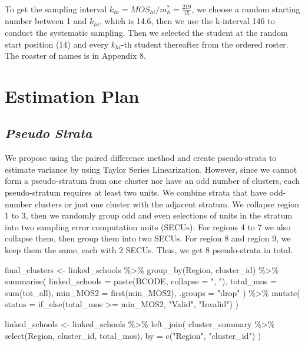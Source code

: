 \documentclass[
  12pt]{article}
\newenvironment{Shaded}{\begin{snugshade}}{\end{snugshade}}
\newcommand{\AttributeTok}[1]{\textcolor[rgb]{0.40,0.45,0.13}{#1}}
\newcommand{\FunctionTok}[1]{\textcolor[rgb]{0.28,0.35,0.67}{#1}}
\newcommand{\NormalTok}[1]{\textcolor[rgb]{0.00,0.23,0.31}{#1}}
\newcommand{\OtherTok}[1]{\textcolor[rgb]{0.00,0.23,0.31}{#1}}
\newcommand{\SpecialCharTok}[1]{\textcolor[rgb]{0.37,0.37,0.37}{#1}}
\newcommand{\StringTok}[1]{\textcolor[rgb]{0.13,0.47,0.30}{#1}}
\begin{document}
To get the sampling interval
\(k_{hi} = MOS_{hi} / m^*_{h} = \frac{219}{15}\), we choose a random
starting number between 1 and \(k_{hi}\), which is 14.6, then we use the
k-interval 146 to conduct the systematic sampling. Then we selected the
student at the random start position (14) and every \(k_{hi}\)-th
student thereafter from the ordered roster. The roaster of names is in
Appendix 8.

\section{Estimation Plan}\label{estimation-plan}

\subsection{\texorpdfstring{\emph{Pseudo
Strata}}{Pseudo Strata}}\label{pseudo-strata}

We propose using the paired difference method and create pseudo-strata
to estimate variance by using Taylor Series Linearization. However,
since we cannot form a pseudo-stratum from one cluster nor have an odd
number of clusters, each pseudo-stratum requires at least two units. We
combine strata that have odd-number clusters or just one cluster with
the adjacent stratum. We collapse region 1 to 3, then we randomly group
odd and even selections of units in the stratum into two sampling error
computation units (SECUs). For regions 4 to 7 we also collapse them,
then group them into two SECUs. For region 8 and region 9, we keep them
the same, each with 2 SECUs. Thus, we get 8 pseudo-strata in total.

\begin{Shaded}
\begin{Highlighting}[]
\NormalTok{final\_clusters }\OtherTok{\textless{}{-}}\NormalTok{ linked\_schools }\SpecialCharTok{\%\textgreater{}\%}
  \FunctionTok{group\_by}\NormalTok{(Region, cluster\_id) }\SpecialCharTok{\%\textgreater{}\%}
  \FunctionTok{summarise}\NormalTok{(}
    \AttributeTok{linked\_schools =} \FunctionTok{paste}\NormalTok{(BCODE, }\AttributeTok{collapse =} \StringTok{", "}\NormalTok{),}
    \AttributeTok{total\_mos =} \FunctionTok{sum}\NormalTok{(tot\_all),}
    \AttributeTok{min\_MOS2 =} \FunctionTok{first}\NormalTok{(min\_MOS2),}
    \AttributeTok{.groups =} \StringTok{"drop"}
\NormalTok{  ) }\SpecialCharTok{\%\textgreater{}\%}
  \FunctionTok{mutate}\NormalTok{(}
    \AttributeTok{status =} \FunctionTok{if\_else}\NormalTok{(total\_mos }\SpecialCharTok{\textgreater{}=}\NormalTok{ min\_MOS2, }\StringTok{"Valid"}\NormalTok{, }\StringTok{"Invalid"}\NormalTok{)}
\NormalTok{  )}


\NormalTok{linked\_schools }\OtherTok{\textless{}{-}}\NormalTok{ linked\_schools }\SpecialCharTok{\%\textgreater{}\%}
  \FunctionTok{left\_join}\NormalTok{(}
\NormalTok{    cluster\_summary }\SpecialCharTok{\%\textgreater{}\%} \FunctionTok{select}\NormalTok{(Region, cluster\_id, total\_mos),}
    \AttributeTok{by =} \FunctionTok{c}\NormalTok{(}\StringTok{"Region"}\NormalTok{, }\StringTok{"cluster\_id"}\NormalTok{)}
\NormalTok{  )}
\end{Highlighting}
\end{Shaded}
\end{document}
